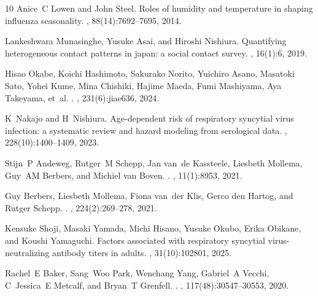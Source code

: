 \documentclass[12pt]{article}
\begin{document}
\begin{thebibliography}{10}
Anice~C Lowen and John Steel.
\newblock Roles of humidity and temperature in shaping influenza seasonality.
, 88(14):7692--7695, 2014.

Lankeshwara Munasinghe, Yusuke Asai, and Hiroshi Nishiura.
\newblock Quantifying heterogeneous contact patterns in japan: a social contact survey.
, 16(1):6, 2019.

Hisao Okabe, Koichi Hashimoto, Sakurako Norito, Yuichiro Asano, Masatoki Sato, Yohei Kume, Mina Chishiki, Hajime Maeda, Fumi Mashiyama, Aya Takeyama, et~al.
.
, 231(6):jiae636, 2024.

K~Nakajo and H~Nishiura.
\newblock Age-dependent risk of respiratory syncytial virus infection: a systematic review and hazard modeling from serological data.
, 228(10):1400--1409, 2023.

Stijn~P Andeweg, Rutger~M Schepp, Jan van~de Kassteele, Liesbeth Mollema, Guy~AM Berbers, and Michiel van Boven.
.
, 11(1):8953, 2021.

Guy Berbers, Liesbeth Mollema, Fiona van~der Klis, Gerco den Hartog, and Rutger Schepp.
.
, 224(2):269--278, 2021.

Kensuke Shoji, Masaki Yamada, Michi Hisano, Yusuke Okubo, Erika Obikane, and Koushi Yamaguchi.
\newblock Factors associated with respiratory syncytial virus-neutralizing antibody titers in adults.
, 31(10):102801, 2025.

Rachel~E Baker, Sang~Woo Park, Wenchang Yang, Gabriel~A Vecchi, C~Jessica~E Metcalf, and Bryan~T Grenfell.
.
, 117(48):30547--30553, 2020.


\end{thebibliography}
\end{document}
